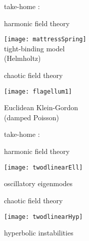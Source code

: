 \begin{frame}{take-home :   }
\begin{center}
            \begin{minipage}[c]{0.40\textwidth}\begin{center}
{\color{purple}harmonic} field theory
\bigskip

\texttt{[image: mattressSpring]}\\
{\color{blue}tight-binding} model \\ ({\color{blue}Helmholtz})
            \end{center}\end{minipage}
            \hspace{2ex}
            \begin{minipage}[c]{0.46\textwidth}\begin{center}
{\color{purple}chaotic} field theory\\
\bigskip
\bigskip
\bigskip

\texttt{[image: flagellum1]}\\
\bigskip

Euclidean {\color{blue}Klein-Gordon} \\ (damped {\color{blue}Poisson})
            \end{center}\end{minipage}
\end{center}
\end{frame} %

\begin{frame}{take-home :   }
\begin{center}
            \begin{minipage}[c]{0.40\textwidth}\begin{center}
{\color{purple}harmonic} field theory
\bigskip

\texttt{[image: twodlinearEll]}\\
\bigskip

{\color{blue}oscillatory eigenmodes}
            \end{center}\end{minipage}
            \hspace{2ex}
            \begin{minipage}[c]{0.46\textwidth}\begin{center}
{\color{purple}chaotic} field theory\\
\bigskip

\texttt{[image: twodlinearHyp]}\\
\bigskip

{\color{blue}hyperbolic instabilities}
            \end{center}\end{minipage}
\end{center}
\end{frame} %

